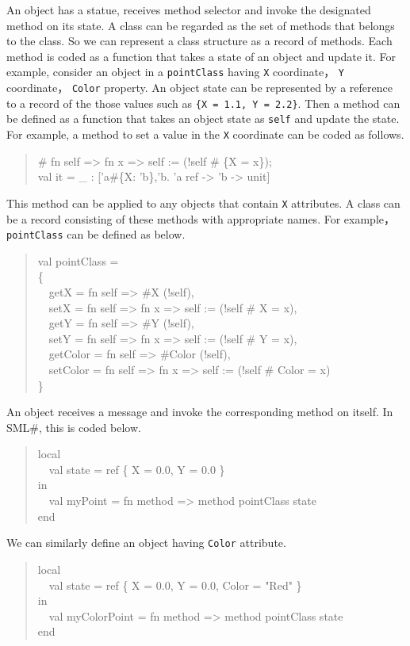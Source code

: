 \documentclass{jbook}
\newcommand{\smlsharp}{SML\#}
\newcommand{\myem}{\mbox{\ \ }}
\newenvironment{program}{\begin{quote}\begin{tt}}%
                        {\end{tt}\end{quote}}
\begin{document}
	An object has a statue, receives method selector and invoke the
designated method on its state.
	A class can be regarded as the set of methods that belongs to the
class.
	So we can represent a class structure as a record of methods.
	Each method is coded as a function that takes a state of an
object and update it. 
	For example, consider an object in a {\tt pointClass} having
{\tt X} coordinate，
{\tt Y} coordinate，
{\tt Color} property.
	An object state can be represented by a reference to a record of
the those values such as {\tt \{X = 1.1, Y = 2.2\}}. 
	Then a method can be defined as a function that takes an object
state as {\tt self} and update the state.
	For example, a method to set a value in the {\tt X} coordinate
can be coded as follows.
\begin{program}
\# fn self => fn x => self := (!self \# \{X = x\});\\
val it = \_ : ['a\#\{X: 'b\},'b. 'a ref -> 'b -> unit]
\end{program}
	This method can be applied to any objects that contain 
{\tt X} attributes.
	A class can be a record consisting of these methods with
appropriate names.
	For example，{\tt pointClass} can be defined as below.
\begin{program}
val pointClass =\\
\{\\
\myem  getX = fn self => \#X (!self),\\
\myem  setX = fn self => fn x => self := (!self \# {X = x}),\\
\myem  getY = fn self => \#Y (!self),\\
\myem  setY = fn self => fn x => self := (!self \# {Y = x}),\\
\myem  getColor = fn self => \#Color (!self),\\
\myem  setColor = fn self => fn x => self := (!self \# {Color = x})\\
\}
\end{program}
	An object receives a message and invoke the corresponding method
on itself.
	In \smlsharp{}, this is coded below.
\begin{program}
local\\
\myem  val state =  ref \{ X = 0.0, Y = 0.0 \}\\
in \\
\myem val myPoint = fn method => method pointClass state\\
end
\end{program}
	We can similarly define an object having {\tt Color} attribute.
\begin{program}
local\\
\myem  val state =  ref \{ X = 0.0, Y = 0.0, Color = "Red" \}\\
in \\
\myem val myColorPoint = fn method => method pointClass state\\
end
\end{program}
\end{document}
